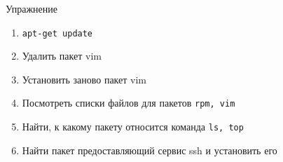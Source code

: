 \begin{frame}[fragile]{Упражнение}
  \begin{enumerate}
      \item {\tt apt-get update}
      \item Удалить пакет vim
      \item Установить заново пакет vim
      \item Посмотреть списки файлов для пакетов {\tt rpm, vim}
      \item Найти, к какому пакету относится команда {\tt ls, top}
      \item Найти пакет предоставляющий сервис ssh и установить его
    \end{enumerate}
\end{frame}


